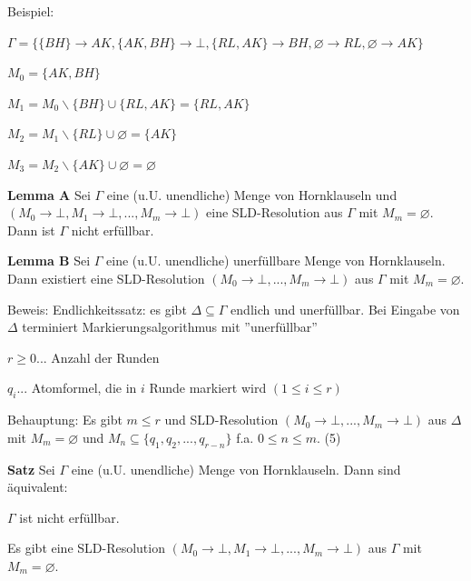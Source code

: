 \documentclass[a4paper]{article}
\renewcommand{\note}[2]{\begin{noteBox} \textbf{#1} #2 \end{noteBox}}
\begin{document}
\begin{multicols}{3}
  Beispiel:
  \begin{itemize*}
    \item $\Gamma =\{\{BH\}\rightarrow AK,\{AK,BH\}\rightarrow\bot,\{RL,AK\}\rightarrow BH,\varnothing\rightarrow RL,\varnothing\rightarrow AK\}$
    \item $M_0 =\{AK,BH\}$
    \item $M_1 =M_0 \backslash\{BH\}\cup\{RL,AK\}=\{RL,AK\}$
    \item $M_2 =M_1 \backslash\{RL\}\cup\varnothing =\{AK\}$
    \item $M_3 =M_2 \backslash\{AK\}\cup\varnothing =\varnothing$
  \end{itemize*}

  \note{Lemma A}{Sei $\Gamma$ eine (u.U. unendliche) Menge von Hornklauseln und $(M_0\rightarrow\bot, M_1\rightarrow\bot,... , M_m\rightarrow\bot)$ eine SLD-Resolution aus $\Gamma$ mit $M_m=\varnothing$. Dann ist $\Gamma$ nicht erfüllbar.}

  \note{Lemma B}{Sei $\Gamma$ eine (u.U. unendliche) unerfüllbare Menge von Hornklauseln. Dann existiert eine SLD-Resolution $(M_0\rightarrow\bot,...,M_m\rightarrow\bot)$ aus $\Gamma$ mit $M_m=\varnothing$.}

  Beweis: Endlichkeitssatz: es gibt $\Delta\subseteq\Gamma$ endlich und unerfüllbar. Bei Eingabe von$\Delta$ terminiert Markierungsalgorithmus mit ''unerfüllbar''
  \begin{itemize*}
    \item $r\geq 0...$ Anzahl der Runden
    \item $q_i...$ Atomformel, die in $i$ Runde markiert wird $(1\leq i\leq r)$
  \end{itemize*}

  Behauptung: Es gibt $m\leq r$ und SLD-Resolution $(M_0\rightarrow\bot,...,M_m\rightarrow\bot)$ aus $\Delta$ mit $M_m=\varnothing$ und $M_n\subseteq\{q_1,q_2,... ,q_{r-n}\}$ f.a. $0\leq n\leq m$. (5)

  \note{Satz}{Sei $\Gamma$ eine (u.U. unendliche) Menge von Hornklauseln. Dann sind äquivalent:
    \begin{enumerate*}
      \item $\Gamma$ ist nicht erfüllbar.
      \item Es gibt eine SLD-Resolution $(M_0\rightarrow\bot,M_1\rightarrow\bot,... ,M_m\rightarrow\bot)$ aus $\Gamma$ mit $M_m=\varnothing$.
    \end{enumerate*}
  }


\end{multicols}
\end{document}
